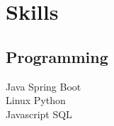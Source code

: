 \documentclass[]{deedy-resume-openfont}
\begin{document}
\begin{minipage}[t]{0.33\textwidth}




\section{Skills}
\subsection{Programming}
\textbullet{} Java \textbullet{} Spring Boot \\
\textbullet{} Linux \textbullet{} Python\\ \textbullet{} Javascript \textbullet{} SQL\\ %
\vspace{0.3em} %

\end{minipage}
\end{document}
